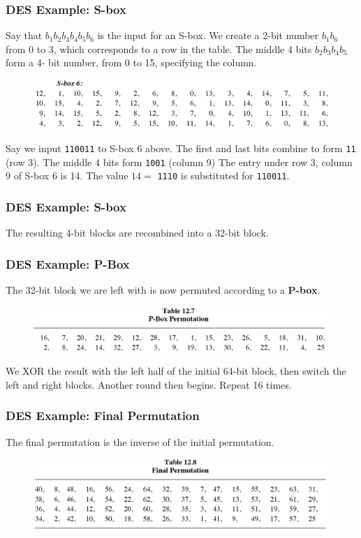 \documentclass{beamer}
\newcommand{\<}{\langle}
\renewcommand{\>}{\rangle}
\begin{document}
\begin{frame}[fragile]
\frametitle{DES Example: S-box}

Say that $b_1b_2b_3b_4b_5b_6$ is the input for an S-box. We create a 2-bit number $b_1b_6$ from 0 to 3, which corresponds to a row in the table. The middle 4 bits $b_2b_3b_4b_5$ form a 4- bit number, from 0 to 15, specifying the column.

\begin{figure}
\includegraphics[scale=.5]{IMG/sbox6}
\end{figure}

Say we input \verb|110011| to S-box 6 above. The first and last bits combine to form \verb|11| (row 3). The middle 4 bits form \verb|1001| (column 9) The entry under row 3, column 9 of S-box 6 is 14. The value $14 =$ \verb|1110| is substituted for \verb|110011|.
\end{frame}


\begin{frame}
\frametitle{DES Example: S-box}

The resulting 4-bit blocks are recombined into a 32-bit block.
\end{frame}


\begin{frame}
\frametitle{DES Example: P-Box}

The 32-bit block we are left with is now permuted according to a \textbf{P-box}. 

\begin{figure}
\includegraphics[scale=.5]{IMG/pbox}
\end{figure}

We XOR the result with the left half of the initial 64-bit block, then switch the left and right blocks. Another round then begins. Repeat 16 times. 
\end{frame}


\begin{frame}
\frametitle{DES Example: Final Permutation}

The final permutation is the inverse of the initial permutation. 

\begin{figure}
\includegraphics[scale=.5]{IMG/ex8}
\end{figure}
\end{frame}
\end{document}
